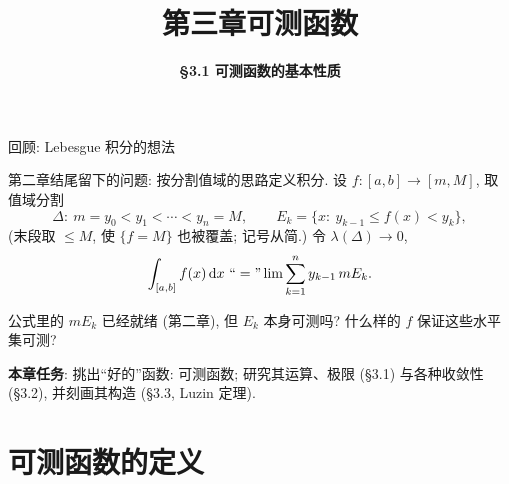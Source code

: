 \everymath{\displaystyle}



\title[第三章\\
可测函数]{\texorpdfstring{\LARGE \bfseries 第三章\quad 可测函数}{第三章 可测函数}}
\author[\S 3.1\\
可测函数的基本性质]
{\Large \bfseries \S 3.1 可测函数的基本性质}
\date{}





\begin{frame}

\titlepage

\end{frame}




\begin{frame}{回顾: Lebesgue 积分的想法}

第二章结尾留下的问题: 按\alert{分割值域}的思路定义积分. 设 $f: [a,b] \to [m, M]$, 取值域分割
\[
\Delta:\ m = y_0 < y_1 < \cdots < y_n = M,
\qquad
E_k = \{x:\ y_{k-1} \leqslant f(x) < y_k\},
\]
(末段取 $\leqslant M$, 使 $\{f = M\}$ 也被覆盖; 记号从简.)
令 $\lambda(\Delta) \to 0$,
\[
\int_{[a,b]} f(x)\,\mathrm{d}x \ ``=" \lim \sum_{k=1}^{n} y_{k-1}\, m E_k .
\]

\pause

\begin{question}
公式里的 $mE_k$ 已经就绪 (第二章), 但 $E_k$ 本身\alert{可测吗}? 什么样的 $f$ 保证这些水平集可测?
\end{question}

\pause

\textbf{本章任务}: 挑出``好的''函数: \alert{可测函数}; 研究其运算、极限 (\S 3.1) 与各种收敛性 (\S 3.2), 并刻画其构造 (\S 3.3, Luzin 定理).

\end{frame}


\section[定义]{可测函数的定义}

